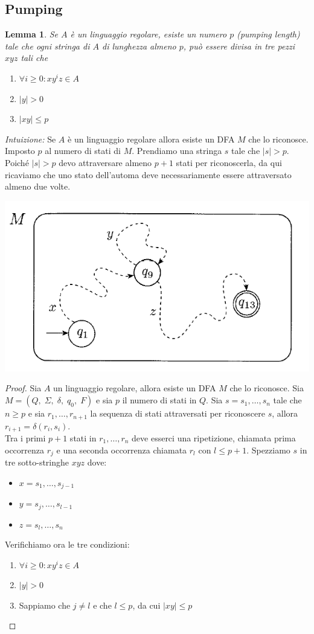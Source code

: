 \documentclass[italian]{article}
\newtheorem*{lemma*}{Lemma}
\begin{document}
\subsection{Pumping}
\begin{lemma*}
	Se $A$ è un linguaggio regolare, esiste un numero $p$ (pumping length) tale che ogni stringa di $A$ di lunghezza almeno $p$, può essere divisa in tre pezzi $xyz$ tali che
	\begin{enumerate}
		\item $\forall i \geq 0: xy^iz \in A$
		\item $|y| > 0$
		\item $|xy| \leq p$
	\end{enumerate}
\end{lemma*}
\noindent
\textit{Intuizione:} Se $A$ è un linguaggio regolare allora esiste un DFA $M$ che lo riconosce. Imposto $p$ al numero di stati di $M$. Prendiamo una stringa $s$ tale che $|s|>p$. Poiché $|s|>p$ devo attraversare almeno $p+1$ stati per riconoscerla, da qui ricaviamo che uno stato dell'automa deve necessariamente essere attraversato almeno due volte.
\begin{center}
	\includegraphics[width=0.3\linewidth]{images/regular_languages_puming}
\end{center}
\begin{proof}
	Sia $A$ un linguaggio regolare, allora esiste un DFA $M$ che lo riconosce. Sia $M = (Q,\;\Sigma,\;\delta,\;q_0,\;F)$ e sia $p$ il numero di stati in $Q$. Sia $s = s_1,\dots,s_n$ tale che $n \geq p$ e sia $r_1,\dots,r_{n+1}$ la sequenza di stati attraversati per riconoscere $s$, allora $r_{i+1} = \delta(r_i,s_i)$. \\
	Tra i primi $p+1$ stati in $r_1,\dots,r_n$ deve esserci una ripetizione, chiamata prima occorrenza $r_j$ e una seconda occorrenza chiamata $r_l$ con $l \leq p+1$. Spezziamo $s$ in tre sotto-stringhe $xyz$ dove:
	\begin{itemize}[label={}]
		\item $x = s_1,\dots,s_{j-1}$
		\item $y = s_j,\dots,s_{l-1}$
		\item $z = s_l,\dots,s_{n}$
	\end{itemize}
	Verifichiamo ora le tre condizioni:
	\begin{enumerate}
		\item $\forall i \geq 0: xy^iz \in A$
		\item $|y| > 0$ 
		\item Sappiamo che $j \neq l$ e che $l \leq p$, da cui $|xy| \leq p$
	\end{enumerate}
\end{proof}
\end{document}
